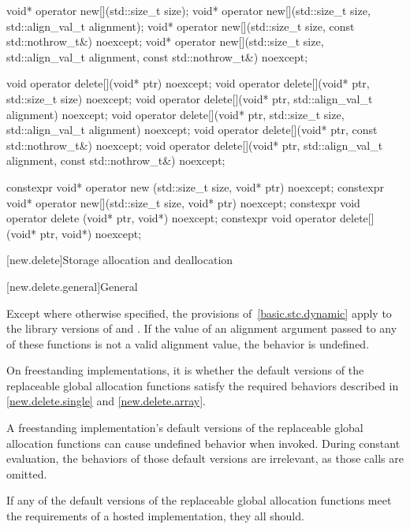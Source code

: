 \begin{codeblock}
void* operator new[](std::size_t size);
void* operator new[](std::size_t size, std::align_val_t alignment);
void* operator new[](std::size_t size, const std::nothrow_t&) noexcept;
void* operator new[](std::size_t size, std::align_val_t alignment,
                     const std::nothrow_t&) noexcept;

void operator delete[](void* ptr) noexcept;
void operator delete[](void* ptr, std::size_t size) noexcept;
void operator delete[](void* ptr, std::align_val_t alignment) noexcept;
void operator delete[](void* ptr, std::size_t size, std::align_val_t alignment) noexcept;
void operator delete[](void* ptr, const std::nothrow_t&) noexcept;
void operator delete[](void* ptr, std::align_val_t alignment, const std::nothrow_t&) noexcept;

constexpr void* operator new  (std::size_t size, void* ptr) noexcept;
constexpr void* operator new[](std::size_t size, void* ptr) noexcept;
constexpr void operator delete  (void* ptr, void*) noexcept;
constexpr void operator delete[](void* ptr, void*) noexcept;
\end{codeblock}

[new.delete]{Storage allocation and deallocation}

[new.delete.general]{General}

\pnum
Except where otherwise specified, the provisions of~\ref{basic.stc.dynamic}
apply to the library versions of  and .
If the value of an alignment argument
passed to any of these functions
is not a valid alignment value,
the behavior is undefined.

\pnum
On freestanding implementations,
it is 
whether the default versions of the replaceable global allocation functions
satisfy the required behaviors
described in \ref{new.delete.single} and \ref{new.delete.array}.
\begin{note}
A freestanding implementation's default versions of
the replaceable global allocation functions
can cause undefined behavior when invoked.
During constant evaluation,
the behaviors of those default versions are irrelevant,
as those calls are omitted.
\end{note}

\recommended
If any of the default versions of the replaceable global allocation functions
meet the requirements of a hosted implementation, they all should.

